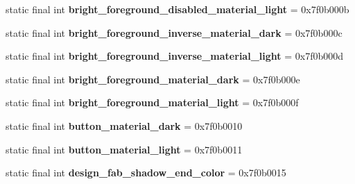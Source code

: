 \begin{DoxyCompactItemize}
\item 
\hypertarget{classandroid_1_1support_1_1design_1_1_r_1_1color_a776883b09016b4f837ed279284e8f16a}{}static final int {\bfseries bright\+\_\+foreground\+\_\+disabled\+\_\+material\+\_\+light} = 0x7f0b000b\label{classandroid_1_1support_1_1design_1_1_r_1_1color_a776883b09016b4f837ed279284e8f16a}

\item 
\hypertarget{classandroid_1_1support_1_1design_1_1_r_1_1color_a0f8c2acced8fd37241fd488cfb6a4397}{}static final int {\bfseries bright\+\_\+foreground\+\_\+inverse\+\_\+material\+\_\+dark} = 0x7f0b000c\label{classandroid_1_1support_1_1design_1_1_r_1_1color_a0f8c2acced8fd37241fd488cfb6a4397}

\item 
\hypertarget{classandroid_1_1support_1_1design_1_1_r_1_1color_ab90e3df7107fcc71538465a8a2f95bd8}{}static final int {\bfseries bright\+\_\+foreground\+\_\+inverse\+\_\+material\+\_\+light} = 0x7f0b000d\label{classandroid_1_1support_1_1design_1_1_r_1_1color_ab90e3df7107fcc71538465a8a2f95bd8}

\item 
\hypertarget{classandroid_1_1support_1_1design_1_1_r_1_1color_af7145fbb518203f5aa6ee291adca6389}{}static final int {\bfseries bright\+\_\+foreground\+\_\+material\+\_\+dark} = 0x7f0b000e\label{classandroid_1_1support_1_1design_1_1_r_1_1color_af7145fbb518203f5aa6ee291adca6389}

\item 
\hypertarget{classandroid_1_1support_1_1design_1_1_r_1_1color_ae39a16e83ec527288841137b165c2d3c}{}static final int {\bfseries bright\+\_\+foreground\+\_\+material\+\_\+light} = 0x7f0b000f\label{classandroid_1_1support_1_1design_1_1_r_1_1color_ae39a16e83ec527288841137b165c2d3c}

\item 
\hypertarget{classandroid_1_1support_1_1design_1_1_r_1_1color_a38c6561c22dceef627a0c105ca5b3273}{}static final int {\bfseries button\+\_\+material\+\_\+dark} = 0x7f0b0010\label{classandroid_1_1support_1_1design_1_1_r_1_1color_a38c6561c22dceef627a0c105ca5b3273}

\item 
\hypertarget{classandroid_1_1support_1_1design_1_1_r_1_1color_ae5e7a4df8be00d0ffa75ddc098ff753c}{}static final int {\bfseries button\+\_\+material\+\_\+light} = 0x7f0b0011\label{classandroid_1_1support_1_1design_1_1_r_1_1color_ae5e7a4df8be00d0ffa75ddc098ff753c}

\item 
\hypertarget{classandroid_1_1support_1_1design_1_1_r_1_1color_a9ba19019371146377edd57f3fc7b3184}{}static final int {\bfseries design\+\_\+fab\+\_\+shadow\+\_\+end\+\_\+color} = 0x7f0b0015\label{classandroid_1_1support_1_1design_1_1_r_1_1color_a9ba19019371146377edd57f3fc7b3184}


\end{DoxyCompactItemize}
